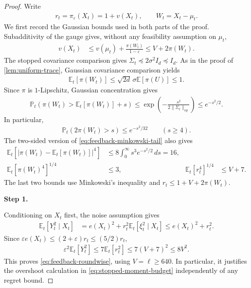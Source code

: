 \documentclass[11pt]{article}
\newcommand{\proofstepinline}[1]{%
    {\sffamily\bfseries\color{blue!55!black}Step #1.}\enspace
}
\newcommand{\E}{\mathbb E}
\newcommand{\Pp}{\mathbb P}
\newcommand{\op}{\mathrm{op}}
\newcommand{\1}{\mathbf 1}
\newcommand{\eps}{\varepsilon}
\begin{document}
\begin{proof}
    Write
    \begin{align}
        r_t=\pi_\eps(X_t)=1+v(X_t),
        \qquad W_t=X_t-\mu_t.
    \end{align}
    We first record the Gaussian bounds used in both parts of the proof.
    Subadditivity of the gauge gives, without any feasibility assumption
    on $\mu_t$,
    \begin{align}
        v(X_t)
         & \leq v(\mu_t)+\frac{\pi(W_t)}{1-\eps}
        \leq V+2\pi(W_t).
        \label{eq:feedback-v-minkowski}
    \end{align}
    The stopped covariance comparison gives
    $\Sigma_t\preceq2\sigma^2I_d\preceq I_d$. As in the proof of
    \cref{lem:uniform-trace}, Gaussian covariance comparison yields
    \begin{align}
        \E_t[\pi(W_t)]
        \leq\sqrt{2d}\,\sigma\E[\pi(U)]\leq1.
        \label{eq:feedback-minkowski-mean}
    \end{align}
    Since $\pi$ is $1$-Lipschitz, Gaussian concentration gives
    \begin{align}
        \Pp_t\left(\pi(W_t)>\E_t[\pi(W_t)]+s\right)
        \leq\exp\left(-\frac{s^2}{2\|\Sigma_t\|_{\op}}\right)
        \leq e^{-s^2/2}.
        \label{eq:feedback-minkowski-tail}
    \end{align}
    In particular,
    \begin{align}
        \Pp_t(2\pi(W_t)>s)\leq e^{-s^2/32}
        \qquad(s\geq4).
        \label{eq:feedback-v-tail}
    \end{align}
    The two-sided version of \eqref{eq:feedback-minkowski-tail} also gives
    \begin{align}
        \E_t\left[\left|\pi(W_t)-\E_t[\pi(W_t)]\right|^4\right]
                               & \leq8\int_0^\infty s^3e^{-s^2/2}\,ds=16,
        \\
        \E_t[\pi(W_t)^4]^{1/4} & \leq3,
                               & \E_t[r_t^4]^{1/4}                        & \leq V+7.
        \label{eq:feedback-gauge-moments}
    \end{align}
    The last two bounds use Minkowski's inequality and
    $r_t\leq1+V+2\pi(W_t)$.

    \proofstepinline{1}
    Conditioning on $X_t$ first, the noise assumption gives
    \begin{align}
        \E_t[Y_t^2\mid X_t]
         & =e(X_t)^2+r_t^2\E_t[\xi_t^2\mid X_t]
        \leq e(X_t)^2+r_t^2.
        \label{eq:Y2-conditional-simple}
    \end{align}
    Since $\eps e(X_t)\leq(2+\eps)r_t\leq(5/2)r_t$,
    \begin{align}
        \eps^2\E_t[Y_t^2]
        \leq7\E_t[r_t^2]
        \leq7(V+7)^2
        \leq8V^2.
    \end{align}
    This proves \eqref{eq:feedback-roundwise}, using $V=\ell\geq640$.
    In particular, it justifies the overshoot calculation in
    \eqref{eq:stopped-moment-budget} independently of any regret bound.


\end{proof}
\end{document}
